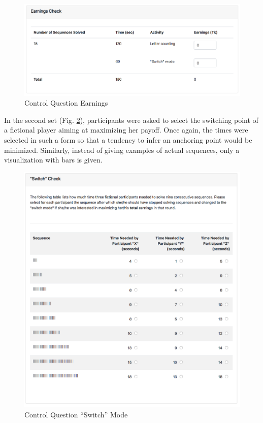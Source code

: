     \begin{figure}
        \centering
        \includegraphics[width=\textwidth]{graphs/cq_earnings.png}
        \caption{Control Question Earnings}
        \label{fig:cq_earnings}
    \end{figure}
    
    In the second set (Fig. \ref{fig:cq_switch}), participants were asked to select the switching point of a fictional player aiming at maximizing her payoff. Once again, the times were selected in such a form so that a tendency to infer an anchoring point would be minimized. Similarly, instead of giving examples of actual sequences, only a visualization with bars is given.
    
    \begin{figure}
        \centering
        \includegraphics[width=\textwidth]{graphs/cq_switch.png}
        \caption{Control Question ``Switch'' Mode}
        \label{fig:cq_switch}
    \end{figure}
    
